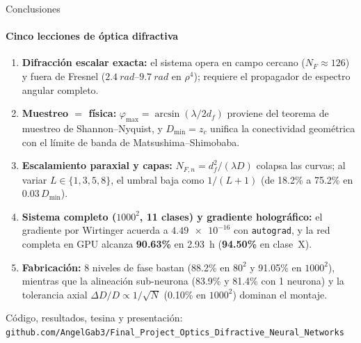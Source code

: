 \documentclass[aspectratio=169,10pt]{beamer}
\newcommand{\Dmin}{D_{\min}}
\begin{document}
\begin{frame}{Conclusiones}
\framesubtitle{Cinco lecciones de óptica difractiva}
\vspace{2pt}
\small
\begin{enumerate}\setlength\itemsep{4pt}
  \item \textbf{Difracción escalar exacta:} el sistema opera en campo cercano ($N_F\approx 126$) y fuera de Fresnel ($\SI{2.4}{rad}$--$\SI{9.7}{rad}$ en $\rho^4$); requiere el propagador de espectro angular completo.
  \item \textbf{Muestreo $=$ física:} $\varphi_{\max}=\arcsin(\lambda/2d_f)$ proviene del teorema de muestreo de Shannon--Nyquist, y $\Dmin=z_c$ unifica la conectividad geométrica con el límite de banda de Matsushima--Shimobaba.
  \item \textbf{Escalamiento paraxial y capas:} $N_{F,n}=d_f^2/(\lambda D)$ colapsa las curvas; al variar $L\in\{1,3,5,8\}$, el umbral baja como $1/(L+1)$ (de 18.2\% a 75.2\% en $0.03\,\Dmin$).
  \item \textbf{Sistema completo ($1000^2$, 11 clases) y gradiente holográfico:} el gradiente por Wirtinger acuerda a $\num{4.49e-16}$ con \texttt{autograd}, y la red completa en GPU alcanza \textbf{90.63\%} en \SI{2.93}{h} (\textbf{94.50\%} en clase~X).
  \item \textbf{Fabricación:} 8 niveles de fase bastan (88.2\% en $80^2$ y 91.05\% en $1000^2$), mientras que la alineación sub-neurona (83.9\% y 81.4\% con 1 neurona) y la tolerancia axial $\Delta D/D \propto 1/\sqrt{N}$ (0.10\% en $1000^2$) dominan el montaje.
\end{enumerate}
\vspace{2pt}
\begin{center}
  {\footnotesize\color{gris} Código, resultados, tesina y presentación: \texttt{github.com/AngelGab3/Final\_Project\_Optics\_Difractive\_Neural\_Networks}}
\end{center}
\end{frame}
\end{document}
